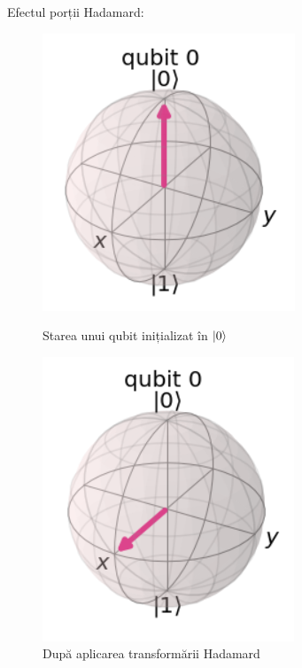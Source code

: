 Efectul porții Hadamard:
\begin{figure}[!htb]
  \includegraphics[width=\linewidth]{continut/capitol1/figuri/BlochDefault.png}
  \caption{Starea unui qubit inițializat în $\ket{0}$}\label{fig:bloch_default1}
\endminipage\hfill
{}
  \includegraphics[width=\linewidth]{continut/capitol1/figuri/BlochHadamard.png}
  \caption{După aplicarea transformării Hadamard}\label{fig:bloch_hadamard}
\endminipage\hfill
\end{figure}

